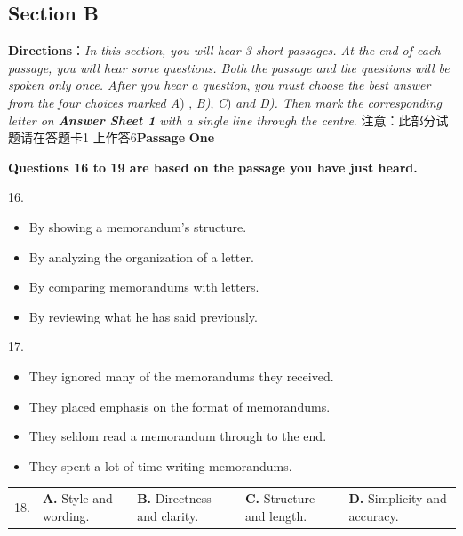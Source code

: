 \documentclass[UTF8,11pt]{ctexart}
\begin{document}
\subsection*{\textbf{Section B}}


\textbf{Directions}：\textit{In this section, you will hear 3 short passages. At the end of each passage, you will hear some questions. Both} \textit{the passage and the questions will be spoken only once. After you hear a question},\textit{ you must choose the best answer from the} \textit{four choices marked A}) ,\textit{ B)},\textit{ C})\textit{ and D). Then mark the corresponding letter on} \textbf{\textit{Answer Sheet 1}}\textit{ with a single line through} \textit{the centre}. 注意：此部分试题请在答题卡1 上作答6\textbf{Passage} \textbf{One}


\textbf{Questions 16 to 19 are based on the passage you have just heard.}


16.


\begin{itemize}[leftmargin=2em,itemsep=.2em,topsep=.4em]\item[A.] By showing a memorandum’s structure.
\item[B.] By analyzing the organization of a letter.
\item[C.] By comparing memorandums with letters.
\item[D.] By reviewing what he has said previously.
\end{itemize}

17.


\begin{itemize}[leftmargin=2em,itemsep=.2em,topsep=.4em]\item[A.] They ignored many of the memorandums they received.
\item[B.] They placed emphasis on the format of memorandums.
\item[C.] They seldom read a memorandum through to the end.
\item[D.] They spent a lot of time writing memorandums.
\end{itemize}

\noindent\begin{tabularx}{\linewidth}{@{}lXXXX@{}}18. & \textbf{A.} Style and wording. & \textbf{B.} Directness and clarity. & \textbf{C.} Structure and length. & \textbf{D.} Simplicity and accuracy.\\\end{tabularx}\par
\end{document}
